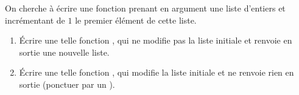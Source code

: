\question On cherche à écrire une fonction prenant en argument une liste d'entiers et incrémentant de $1$ le premier élément de cette liste. 
\begin{enumerate}[label=\emph{\alph*)}]
  \item \'Ecrire une telle fonction , qui ne modifie pas la liste initiale et renvoie en sortie une nouvelle liste.
  \item \'Ecrire une telle fonction , qui modifie la liste initiale et ne renvoie rien en sortie (ponctuer par un ).
\end{enumerate}